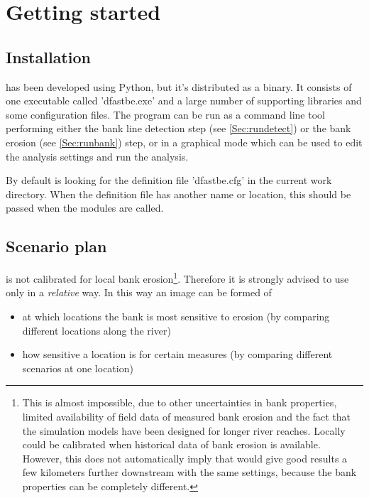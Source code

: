 \chapter{Getting started} \label{GetStarted}

\section{Installation}

\dfastbe has been developed using Python, but it's distributed as a binary.
It consists of one executable called 'dfastbe.exe' and a large number of supporting libraries and some configuration files.
The program can be run as a command line tool performing either the bank line detection step (see \autoref{Sec:rundetect}) or the bank erosion (see \autoref{Sec:runbank}) step, or in a graphical mode which can be used to edit the analysis settings and run the analysis.

By default \dfastbe is looking for the definition file 'dfastbe.cfg' in the current work directory.
When the definition file has another name or location, this should be passed when the modules are called.

\section{Scenario plan}

\dfastbe is not calibrated for local bank erosion\footnote{This is almost impossible, due to other uncertainties in bank properties, limited availability of field data of measured bank erosion and the fact that the simulation models have been designed for longer river reaches.
Locally \dfastbe could be calibrated when historical data of bank erosion is available.
However, this does not automatically imply that \dfastbe would give good results a few kilometers further downstream with the same settings, because the bank properties can be completely different.}.
Therefore it is strongly advised to use \dfastbe only in a \emph{relative} way.
In this way an image can be formed of

\begin{itemize}
\item at which locations the bank is most sensitive to erosion (by comparing different locations along the river)
\item how sensitive a location is for certain measures (by comparing different scenarios at one location)
\end{itemize}

